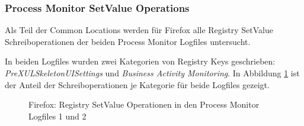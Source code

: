 \begin{appendices}
\subsubsection*{Process Monitor SetValue Operations}
\label{subsubsection:appendix-firefox-registry-processmonitorsetvalue}
Als Teil der Common Locations werden für Firefox alle Registry \glqq{}SetValue\grqq{} Schreiboperationen der beiden Process Monitor Logfiles untersucht.

In beiden Logfiles wurden zwei Kategorien von Registry Keys geschrieben: \textit{PreXULSkeletonUISettings} und \textit{Business Activity Monitoring}. In Abbildung \ref{chart:firefox-registy-css-vs-bam} ist der Anteil der Schreiboperationen je Kategorie für beide Logfiles gezeigt.
\begin{figure}[h!]
	\caption{Firefox: Registry \glqq{}SetValue\grqq{} Operationen in den Process Monitor Logfiles 1 und 2}
	\label{chart:firefox-registy-css-vs-bam}
\end{figure}



\end{appendices}
